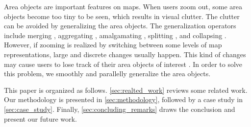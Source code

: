 \documentclass{ica}
\begin{document}


Area objects are important features on maps. 
When users zoom out,
some area objects become too tiny to be seen,
which results in visual clutter.
The clutter can be avoided by generalizing the 
area objects.
The generalization operators include
merging \citep[\eg][]{HaunertWolff2010AreaAgg}, 
aggregating \citep[\eg][]{Shen2019Aggregation}, 
amalgamating \citep[\eg][]{Regnauld2007Amalgamation}, 
splitting \citep[\eg][]{Meijers2016Split}, 
and collapsing \citep[\eg][]{Haunert2008Skeleton}.
However, if zooming is realized by switching between
some levels of map representations, 
large and discrete changes usually happen.
This kind of changes may cause users to lose track of
their area objects of interest \citep{vanKreveld2001}.
In order to solve this problem, 
we smoothly and parallelly generalize the area objects.

This paper is organized as follows.
\sect\ref{sec:realted_work} reviews some related work.
Our methodology is presented in \sect\ref{sec:methodology},
followed by a case study in \sect\ref{sec:case_study}.
Finally, \sect\ref{sec:concluding_remarks} draws the conclusion
and present our future work.





%
%
\end{document}
